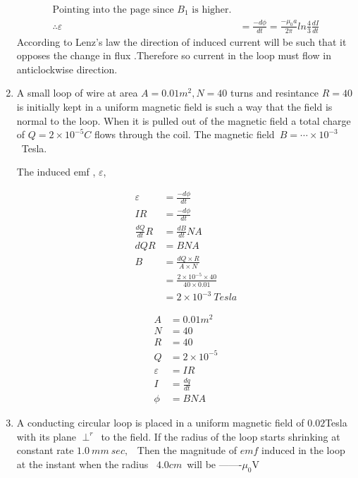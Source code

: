 \begin{enumerate}[ label=\color{ocre}\textbf{\arabic*.}]
\begin{answer}
\begin{align*}
		\text{Pointing into the page since $B_1$\ is higher.}\\
		\therefore\varepsilon&=\frac{-d\phi}{dt}=\frac{-\mu_0 a}{2\pi}ln\frac{4}{3}\frac{dI}{dt}
		\end{align*}
		According to Lenz's law the direction of induced current will be such that it opposes the change in flux .Therefore so current in the loop must flow in anticlockwise direction.
	\end{answer}
	\item A small loop of wire at area $A=0.01m^2,N=40$ turns and resintance $R=40$ is initially kept in a uniform magnetic field is such a way that the field is normal to the loop. When it is pulled out of the magnetic field a total charge of $Q=2\times10^{-5}C$ flows through the coil. The magnetic field\ $B=\cdots  \times10^{-3}$\ Tesla.\\
	\begin{answer}
		The induced emf , $\varepsilon$,\\
		\begin{minipage}{0.60\textwidth}
			\begin{align*}
			\varepsilon&=\frac{-d\phi}{dt}\\
			IR&=\frac{-d\phi}{dt}\\
			\frac{dQ}{dt}R&=\frac{dB}{dt}NA\\
			dQR&=BNA\\
			B&=\frac{dQ\times R}{A\times N}\\
			&=\frac{2\times10^{-5}\times40}{40\times0.01}\\
			&=2\times10^{-3}\ Tesla
			\end{align*}
		\end{minipage}
		\begin{minipage}{0.40\textwidth}
			\begin{align*}
			A&=0.01m^2\\
			N&=40\\
			R&=40\\
			Q&=2\times10^{-5}\\
			\varepsilon&=IR\\
			I&=\frac{dq}{dt}\\
			\phi&=BNA
			\end{align*}
		\end{minipage}
	\end{answer}
	\item A conducting circular loop is placed in a uniform magnetic field of $0.02$Tesla with its plane $\perp^r$\ to the field. If the radius of the loop starts shrinking at constant rate $1.0\ mm \ sec,$ \ Then the magnitude of $emf$ induced in the loop at the instant when the radius \ $4.0cm$\ will be -------$\mu_0$V\\

\end{enumerate}
